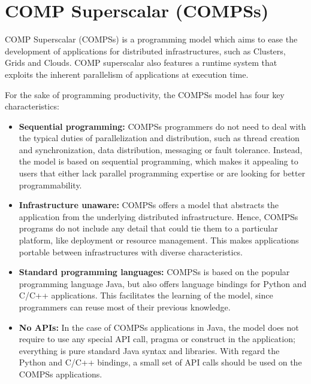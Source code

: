 \section{COMP Superscalar (COMPSs)}
\label{sec:Introduction}

COMP Superscalar (COMPSs) is a programming model which aims to ease the development of applications for distributed infrastructures, such as Clusters, Grids and Clouds. COMP superscalar also features a runtime system that exploits the inherent parallelism of applications at execution time.

For the sake of programming productivity, the COMPSs model has four key characteristics:

\begin{itemize}
 
 \item  {\bf Sequential programming:} COMPSs programmers do not need to deal with the typical duties of parallelization and distribution, such as thread creation and synchronization, data distribution, messaging or fault tolerance. Instead, the model is based on sequential programming, which makes it appealing to users that either lack parallel programming expertise or are looking for better programmability.
 
 \item  {\bf Infrastructure unaware:} COMPSs offers a model that abstracts the application from the underlying distributed infrastructure. Hence, COMPSs programs do not include any detail that could tie them to a particular platform, like deployment or resource management. This makes applications portable between infrastructures with diverse characteristics.
 
 \item  {\bf Standard programming languages:} COMPSs is based on the popular programming language Java, but also offers language bindings for Python and C/C++ applications. This facilitates the learning of the model, since programmers can reuse most of their previous knowledge.
 
 \item  {\bf No APIs:} In the case of COMPSs applications in Java, the model does not require to use any special API call, pragma or construct in the application; everything is pure standard Java syntax and libraries. With regard the Python and C/C++ bindings, a small set of API calls should be used on the COMPSs applications.

\end{itemize}

